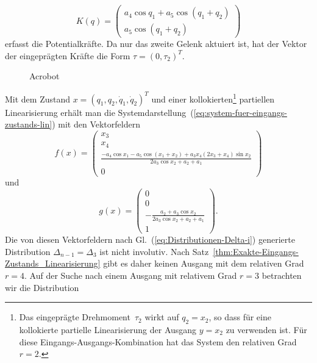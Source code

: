 \begin{example}
\[
K(q)=\left(\begin{array}{c}
a_{4}\cos q_{1}+a_{5}\cos(q_{1}+q_{2})\\
a_{5}\cos(q_{1}+q_{2})
\end{array}\right)
\]
erfasst die Potentialkräfte. Da nur das zweite Gelenk aktuiert ist,
hat der Vektor der eingeprägten Kräfte die Form $\tau=(0,\tau_{2})^{T}$. 

\begin{figure}
\begin{centering}
\resizebox{0.5\textwidth}{!}{}
\par\end{centering}
\caption{Acrobot\label{fig:Acrobot}}
\end{figure}

Mit dem Zustand $x=(q_{1},q_{2},\dot{q}_{1},\dot{q}_{2})^{T}$ und
einer kollokierten\footnote{Das eingeprägte Drehmoment~$\tau_{2}$ wirkt auf $q_{2}=x_{2}$,
so dass für eine kollokierte partielle Linearisierung der Ausgang
$y=x_{2}$ zu verwenden ist. Für diese Eingangs-Ausgangs-Kombination
hat das System den relativen Grad $r=2$.} partiellen Linearisierung erhält
man die Systemdarstellung~(\ref{eq:system-fuer-eingangs-zustands-lin})
mit den Vektorfeldern
\begin{equation}
f(x)=\left(\begin{array}{c}
x_{3}\\
x_{4}\\
\frac{-a_{4}\cos x_{1}-a_{5}\cos\left(x_{1}+x_{2}\right)+a_{3}x_{4}(2x_{3}+x_{4})\sin x_{2}}{2a_{3}\cos x_{2}+a_{2}+a_{1}}\\
0
\end{array}\right)\label{eq:acrobot-f}
\end{equation}
und 
\begin{equation}
g(x)=\left(\begin{array}{c}
0\\
0\\
-\frac{a_{2}+a_{3}\cos x_{2}}{2a_{3}\cos x_{2}+a_{2}+a_{1}}\\
1
\end{array}\right).\label{eq:acrobot-g}
\end{equation}
Die von diesen Vektorfeldern nach Gl.~(\ref{eq:Distributionen-Delta-i})
generierte Distribution $\Delta_{n-1}=\Delta_{3}$ ist nicht involutiv.
Nach Satz~\ref{thm:Exakte-Eingangs-Zustands_Linearisierung} gibt
es daher keinen Ausgang mit dem relativen Grad $r=4$. Auf der Suche
nach einem Ausgang mit relativem Grad $r=3$ betrachten wir die Distribution

\end{example}
